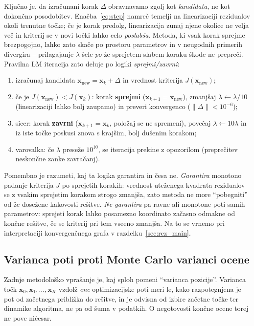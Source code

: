 \documentclass[a4paper,11pt]{article}
\begin{document}
Ključno je, da izračunani korak $\Delta$ obravnavamo zgolj kot \emph{kandidata}, ne kot dokončno posodobitev. Enačba~\eqref{eq:step} namreč temelji na linearizaciji rezidualov okoli trenutne točke; če je korak predolg, linearizacija zunaj njene okolice ne velja več in kriterij se v novi točki lahko celo \emph{poslabša}. Metoda, ki vsak korak sprejme brezpogojno, lahko zato skače po prostoru parametrov in v neugodnih primerih divergira -- prilagajanje $\lambda$ šele \emph{po} že sprejetem slabem koraku škode ne prepreči. Pravilna LM iteracija zato deluje po logiki \emph{sprejmi/zavrni}:
\begin{enumerate}
    \item izračunaj kandidata $\mathbf{x}_{\text{new}} = \mathbf{x}_k + \Delta$ in vrednost kriterija $J(\mathbf{x}_{\text{new}})$;
    \item če je $J(\mathbf{x}_{\text{new}}) < J(\mathbf{x}_k)$: korak \textbf{sprejmi} ($\mathbf{x}_{k+1} = \mathbf{x}_{\text{new}}$), zmanjšaj $\lambda \leftarrow \lambda/10$ (linearizaciji lahko bolj zaupamo) in preveri konvergenco ($\|\Delta\| < 10^{-6}$);
    \item sicer: korak \textbf{zavrni} ($\mathbf{x}_{k+1} = \mathbf{x}_k$, položaj se ne spremeni), povečaj $\lambda \leftarrow 10\lambda$ in iz iste točke poskusi znova s krajšim, bolj dušenim korakom;
    \item varovalka: če $\lambda$ preseže $10^{10}$, se iteracija prekine z opozorilom (preprečitev neskončne zanke zavračanj).
\end{enumerate}

Pomembno je razumeti, kaj ta logika garantira in česa ne. \emph{Garantira} monotono padanje kriterija $J$ po sprejetih korakih: vrednost uteženega kvadrata rezidualov se z vsakim sprejetim korakom strogo zmanjša, zato metoda ne more ``pobegniti'' od že dosežene kakovosti rešitve. \emph{Ne garantira} pa ravne ali monotone poti samih parametrov: sprejeti korak lahko posamezno koordinato začasno odmakne od končne rešitve, če se kriterij pri tem vseeno zmanjša. Na to se vrnemo pri interpretaciji konvergenčnega grafa v razdelku~\ref{sec:rez_main}.

\subsection{Varianca poti proti Monte Carlo varianci ocene}
\label{sec:mc_teorija}
Zadnje metodološko vprašanje je, kaj sploh pomeni ``varianca pozicije''. Varianca točk $\mathbf{x}_0, \mathbf{x}_1, \dots, \mathbf{x}_K$ vzdolž \emph{ene} optimizacijske poti meri le, kako razpotegnjena je pot od začetnega približka do rešitve, in je odvisna od izbire začetne točke ter dinamike algoritma, ne pa od šuma v podatkih. O negotovosti končne ocene torej ne pove ničesar.
\end{document}
